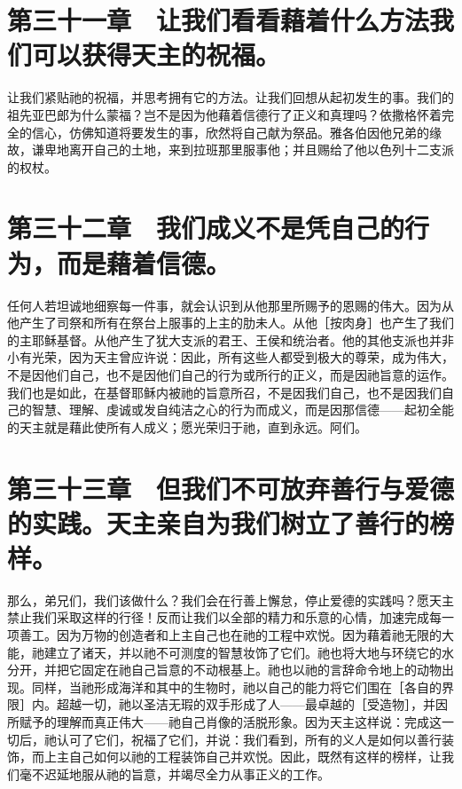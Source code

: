 
\section{第三十一章　让我们看看藉着什么方法我们可以获得天主的祝福。}

让我们紧贴祂的祝福，并思考拥有它的方法。让我们回想从起初发生的事。我们的祖先亚巴郎为什么蒙福？岂不是因为他藉着信德行了正义和真理吗？依撒格怀着完全的信心，仿佛知道将要发生的事，欣然将自己献为祭品。雅各伯因他兄弟的缘故，谦卑地离开自己的土地，来到拉班那里服事他；并且赐给了他以色列十二支派的权杖。\par


\section{第三十二章　我们成义不是凭自己的行为，而是藉着信德。}

任何人若坦诚地细察每一件事，就会认识到从他那里所赐予的恩赐的伟大。因为从他产生了司祭和所有在祭台上服事的上主的肋未人。从他［按肉身］也产生了我们的主耶稣基督。从他产生了犹大支派的君王、王侯和统治者。他的其他支派也并非小有光荣，因为天主曾应许说：因此，所有这些人都受到极大的尊荣，成为伟大，不是因他们自己，也不是因他们自己的行为或所行的正义，而是因祂旨意的运作。我们也是如此，在基督耶稣内被祂的旨意所召，不是因我们自己，也不是因我们自己的智慧、理解、虔诚或发自纯洁之心的行为而成义，而是因那信德——起初全能的天主就是藉此使所有人成义；愿光荣归于祂，直到永远。阿们。\par


\section{第三十三章　但我们不可放弃善行与爱德的实践。天主亲自为我们树立了善行的榜样。}

那么，弟兄们，我们该做什么？我们会在行善上懈怠，停止爱德的实践吗？愿天主禁止我们采取这样的行径！反而让我们以全部的精力和乐意的心情，加速完成每一项善工。因为万物的创造者和上主自己也在祂的工程中欢悦。因为藉着祂无限的大能，祂建立了诸天，并以祂不可测度的智慧妆饰了它们。祂也将大地与环绕它的水分开，并把它固定在祂自己旨意的不动根基上。祂也以祂的言辞命令地上的动物出现。同样，当祂形成海洋和其中的生物时，祂以自己的能力将它们围在［各自的界限］内。超越一切，祂以圣洁无瑕的双手形成了人——最卓越的［受造物］，并因所赋予的理解而真正伟大——祂自己肖像的活脱形象。因为天主这样说：完成这一切后，祂认可了它们，祝福了它们，并说：我们看到，所有的义人是如何以善行装饰，而上主自己如何以祂的工程装饰自己并欢悦。因此，既然有这样的榜样，让我们毫不迟延地服从祂的旨意，并竭尽全力从事正义的工作。\par

